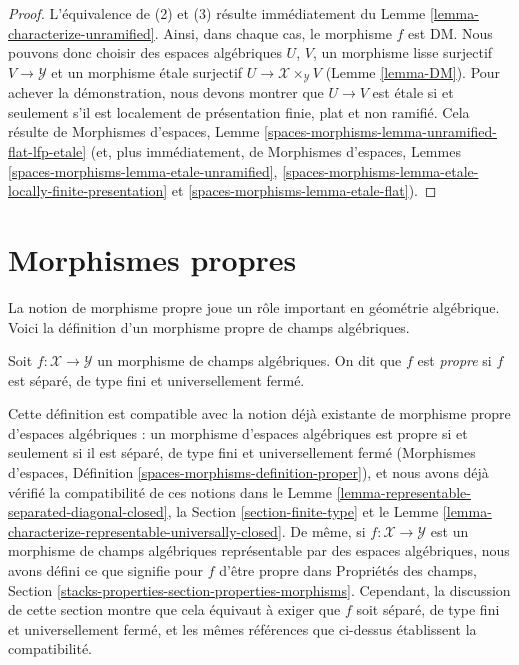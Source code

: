 \begin{proof}
L'\'equivalence de (2) et (3) r\'esulte imm\'ediatement du
Lemme \ref{lemma-characterize-unramified}. Ainsi, dans chaque cas,
le morphisme $f$ est DM.
Nous pouvons donc choisir des espaces alg\'ebriques $U$, $V$,
un morphisme lisse surjectif
$V \to \mathcal{Y}$ et un morphisme \'etale surjectif
$U \to \mathcal{X} \times_\mathcal{Y} V$ (Lemme \ref{lemma-DM}).
Pour achever la d\'emonstration, nous devons montrer que
$U \to V$ est \'etale si et seulement s'il est localement de pr\'esentation
finie, plat et non ramifi\'e.
Cela r\'esulte de Morphismes d'espaces, Lemme
\ref{spaces-morphisms-lemma-unramified-flat-lfp-etale}
(et, plus imm\'ediatement, de Morphismes d'espaces, Lemmes
\ref{spaces-morphisms-lemma-etale-unramified},
\ref{spaces-morphisms-lemma-etale-locally-finite-presentation} et
\ref{spaces-morphisms-lemma-etale-flat}).
\end{proof}






\section{Morphismes propres}
\label{section-proper}

\noindent
La notion de morphisme propre joue un rôle important en géométrie algébrique.
Voici la définition d'un morphisme propre de champs algébriques.

\begin{definition}
\label{definition-proper}
Soit $f : \mathcal{X} \to \mathcal{Y}$
un morphisme de champs algébriques.
On dit que $f$ est {\it propre} si $f$ est séparé, de type fini et
universellement fermé.
\end{definition}

\noindent
Cette définition est compatible avec la notion déjà existante de morphisme propre
d'espaces algébriques : un morphisme d'espaces algébriques est propre si et seulement si
il est séparé, de type fini et universellement fermé
(Morphismes d'espaces, Définition \ref{spaces-morphisms-definition-proper}),
et nous avons déjà vérifié la compatibilité de ces notions dans le
Lemme \ref{lemma-representable-separated-diagonal-closed},
la Section \ref{section-finite-type} et le
Lemme \ref{lemma-characterize-representable-universally-closed}.
De même, si $f : \mathcal{X} \to \mathcal{Y}$ est un
morphisme de champs algébriques représentable par des espaces algébriques,
nous avons défini ce que signifie pour $f$ d'être propre dans
Propriétés des champs, Section
\ref{stacks-properties-section-properties-morphisms}.
Cependant, la discussion de cette section montre que cela
équivaut à exiger que $f$ soit séparé, de type fini et
universellement fermé, et les mêmes références que ci-dessus établissent la
compatibilité.

